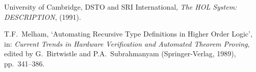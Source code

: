 \begin{thebibliography}{99}

University of Cambridge, {\small DSTO} and {\small SRI} International,
{\it The HOL System: DESCRIPTION}, (1991).

T.F.\ Melham, `Automating Recursive Type Definitions
in Higher Order Logic',
in: {\it Current Trends in Hardware Verification and
Automated Theorem Proving\/}, edited by G.\ Birtwistle
and P.A.\ Subrahmanyam
(Springer-Verlag, 1989), pp.\ 341--386.

\end{thebibliography}


